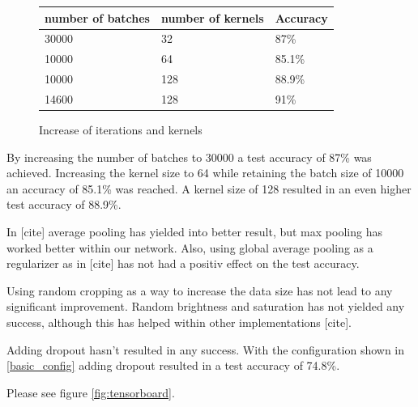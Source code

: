\documentclass{article}
\begin{document}
\begin{enumerate}
\begin{enumerate}
\begin{item}
\begin{figure}
			\quad
			\begin{subtable}[b]{0.4\textwidth}
				\begin{tabular}{lll}
        					\toprule
        					number of batches & number of kernels    & Accuracy \\
        					\midrule
        					30000  & 32 & 87\%  \\
        					10000  & 64 & 85.1\%  \\
					10000 &128 & 88.9\%  \\
					14600  & 128 & 91\%  \\
					\bottomrule
     				\end{tabular}
				\caption{Increase of iterations and kernels}
				\label{kernels}
			\end{subtable}
		\end{figure}
		
			By increasing the number of batches to 30000 a test accuracy of 87\% was achieved. Increasing the kernel size to 64 while retaining the batch size of 10000 an accuracy of 85.1\% was reached. A kernel size of 128 resulted in an even higher test accuracy of 88.9\%. 
		\end{item}
		
		
		
		
		\begin{item}
			In [cite] average pooling has yielded into better result, but max pooling has worked better within our network.
			Also, using global average pooling as a regularizer as in [cite] has not had a positiv effect on the test accuracy.
			
		\end{item}
		
		
		
		\begin{item}
			Using random cropping as a way to increase the data size has not lead to any significant improvement. 
			Random brightness and saturation has not yielded any success, although this has helped within other implementations [cite].
		\end{item}
		
		
		
		\begin{item}
			Adding dropout hasn't resulted in any success. With the configuration shown in  \ref{basic_config} adding dropout resulted in a test accuracy of 74.8\%.
		\end{item}
		
		
		
		\begin{item}
			Please see  figure \ref{fig:tensorboard}. 


\end{item}
\end{enumerate}
\end{enumerate}
\end{document}
